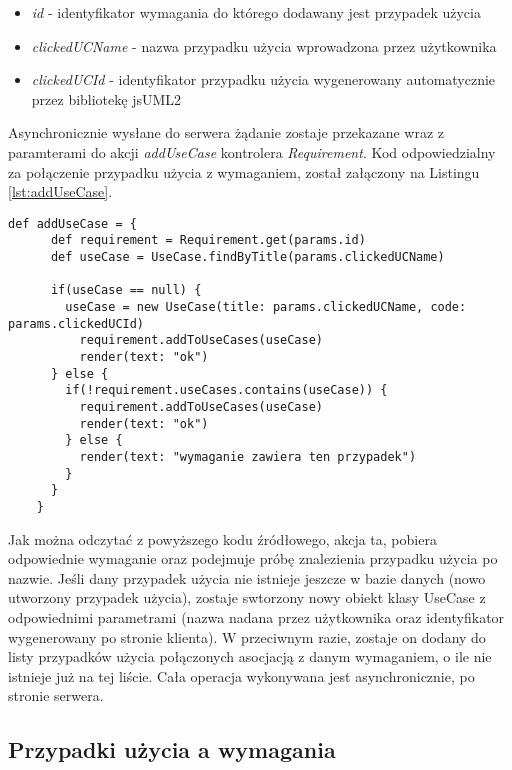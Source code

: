     \begin{itemize}
      \item \emph{id} - identyfikator wymagania do którego dodawany jest przypadek użycia
      \item \emph{clickedUCName} - nazwa przypadku użycia wprowadzona przez użytkownika
      \item \emph{clickedUCId} - identyfikator przypadku użycia wygenerowany automatycznie przez bibliotekę jsUML2
    \end{itemize}

    Asynchronicznie wysłane do serwera żądanie zostaje przekazane wraz z paramterami do akcji \emph{addUseCase} kontrolera \emph{Requirement}. Kod odpowiedzialny za połączenie przypadku użycia z wymaganiem, został załączony na Listingu \ref{lst:addUseCase}.

    \begin{lstlisting}[caption={addUseCase}, label={lst:addUseCase}]
    def addUseCase = {
      def requirement = Requirement.get(params.id)
      def useCase = UseCase.findByTitle(params.clickedUCName)

      if(useCase == null) {
        useCase = new UseCase(title: params.clickedUCName, code: params.clickedUCId)
          requirement.addToUseCases(useCase)
          render(text: "ok")
      } else {
        if(!requirement.useCases.contains(useCase)) {
          requirement.addToUseCases(useCase)
          render(text: "ok")
        } else {
          render(text: "wymaganie zawiera ten przypadek")
        }
      }
    }
    \end{lstlisting}

    Jak można odczytać z powyższego kodu źródłowego, akcja ta, pobiera odpowiednie wymaganie oraz podejmuje próbę znalezienia przypadku użycia po nazwie. Jeśli dany przypadek użycia nie istnieje jeszcze w bazie danych (nowo utworzony przypadek użycia), zostaje swtorzony nowy obiekt klasy UseCase z odpowiednimi parametrami (nazwa nadana przez użytkownika oraz identyfikator wygenerowany po stronie klienta). W przeciwnym razie, zostaje on dodany do listy przypadków użycia połączonych asocjacją z danym wymaganiem, o ile nie istnieje już na tej liście. Cała operacja wykonywana jest asynchronicznie, po stronie serwera. 

    \subsection{Przypadki użycia a wymagania}
    
